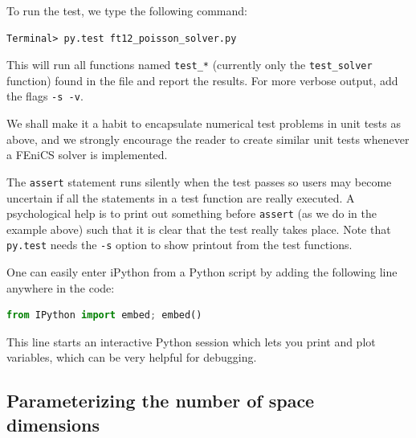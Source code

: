 \documentclass[graybox,envcountchap,sectrefs,final]{svmonodo}
\newenvironment{notice_mdfboxadmon}[1][]{
\begin{notice_mdfboxmdframed}[frametitle=#1]
}
{
\end{notice_mdfboxmdframed}
}
\begin{document}
To run the test, we type the following command:

\begin{Verbatim}[frame=lines,label=\fbox{{\tiny Terminal}},framesep=2.5mm,framerule=0.7pt,fontsize=\fontsize{9pt}{9pt}]
Terminal> py.test ft12_poisson_solver.py
\end{Verbatim}
This will run all functions named \Verb!test_*! (currently only the
\Verb!test_solver! function) found in the file and report the results.
For more verbose output, add the flags \texttt{-s -v}.

We shall make it a habit to encapsulate numerical test problems in
unit tests as above, and we strongly encourage the reader to create
similar unit tests whenever a FEniCS solver is implemented.


\begin{notice_mdfboxadmon}
The \texttt{assert} statement runs silently when the test passes so users may
become uncertain if all the statements in a test function are really
executed. A psychological help is to print out something before \texttt{assert}
(as we do in the example above) such that it is clear that the
test really takes place.
Note that \texttt{py.test} needs the \texttt{-s} option to show printout
from the test functions.
\end{notice_mdfboxadmon} %




\begin{notice_mdfboxadmon}
One can easily enter iPython from a Python script by adding the following
line anywhere in the code:
\begin{lstlisting}[language=Python,style=graycolor]
from IPython import embed; embed()
\end{lstlisting}
This line starts an interactive Python session which lets you
print and plot variables, which can be very helpful for debugging.
\end{notice_mdfboxadmon} %

\subsection{Parameterizing the number of space dimensions}
\label{ch:poisson0:nD}

\end{document}
